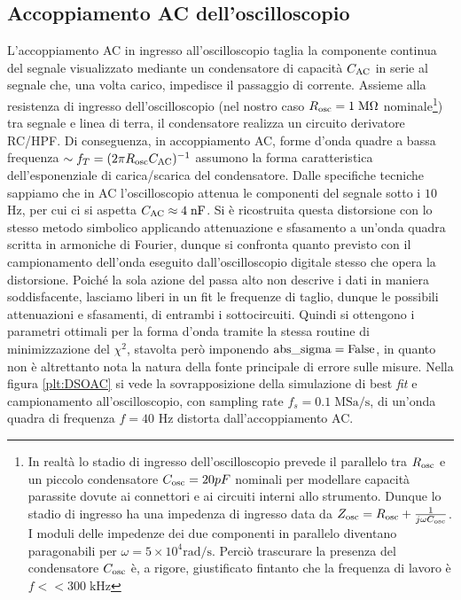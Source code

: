 \documentclass{article}[a4paper, oneside ,11pt]
\begin{document}
\subsection{Accoppiamento AC dell'oscilloscopio}
L’accoppiamento AC in ingresso all’oscilloscopio taglia la componente continua del segnale visualizzato mediante un condensatore di capacità $C_{\rm AC}$ in serie al segnale che, una volta carico, impedisce il passaggio di corrente. Assieme alla resistenza di ingresso dell’oscilloscopio (nel nostro caso $R_{\rm osc} = 1 \; \si{\mega\ohm}$ nominale\footnote{In realtà lo stadio di ingresso dell’oscilloscopio prevede il parallelo tra $R_{\rm osc}$ e un piccolo condensatore $C_{\rm osc} = 20 pF$ nominali per modellare capacità parassite dovute ai connettori e ai circuiti interni allo strumento. Dunque lo stadio di ingresso ha una impedenza di ingresso data da $Z_{\rm osc}= R_{\rm osc} + \frac{1}{j \omega C_{\rm osc}} $. I moduli delle impedenze dei due componenti in parallelo diventano paragonabili per $\omega = 5 \times 10^4 \si{\radian\per\s}$. Perciò trascurare la presenza del condensatore $C_{\rm osc}$ è, a rigore, giustificato fintanto che la frequenza di lavoro è $f << 300 \; \si{\kilo\hertz}$}) tra segnale e linea di terra, il condensatore realizza un circuito derivatore RC/HPF. Di conseguenza, in accoppiamento AC,  forme d’onda quadre a bassa frequenza $\sim f_T = (2\pi R_{\rm osc}C_{\rm AC})^{-1}$ assumono la forma caratteristica dell'esponenziale di carica/scarica del condensatore. Dalle specifiche tecniche sappiamo che in AC l'oscilloscopio attenua le componenti del segnale sotto i $10$ Hz, per cui ci si aspetta $C_{\rm AC} \approx 4 \; \si{\nano\F}$. Si è ricostruita questa distorsione con lo stesso metodo simbolico applicando attenuazione e sfasamento a un'onda quadra scritta in armoniche di Fourier, dunque si confronta quanto previsto con il campionamento dell'onda eseguito dall'oscilloscopio digitale stesso che opera la distorsione. Poiché la sola azione del passa alto non descrive i dati in maniera soddisfacente, lasciamo liberi in un fit le frequenze di taglio, dunque le possibili attenuazioni e sfasamenti, di entrambi i sottocircuiti. Quindi si ottengono i parametri ottimali per la forma d'onda tramite la stessa routine di minimizzazione del $\chi^2$, stavolta però imponendo $\rm{abs\_sigma} = \rm False$, in quanto non è altrettanto nota la natura della fonte principale di errore sulle misure. Nella figura \ref{plt:DSOAC} si vede la sovrapposizione della simulazione di best \emph{fit} e campionamento all’oscilloscopio, con sampling rate $f_s = 0.1 \; \mathrm{MSa/s}$, di un’onda quadra di frequenza $f = 40$ Hz distorta dall'accoppiamento AC.
\end{document}

